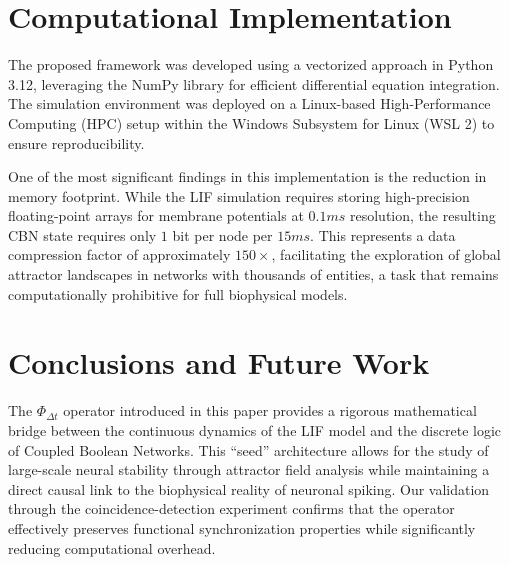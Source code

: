 \documentclass[10pt, conference]{IEEEtran}
\begin{document}

\section{Computational Implementation}

The proposed framework was developed using a vectorized approach in Python 3.12, leveraging the NumPy library for efficient differential equation integration. The simulation environment was deployed on a Linux-based High-Performance Computing (HPC) setup within the Windows Subsystem for Linux (WSL 2) to ensure reproducibility.

One of the most significant findings in this implementation is the reduction in memory footprint. While the LIF simulation requires storing high-precision floating-point arrays for membrane potentials at $0.1ms$ resolution, the resulting CBN state requires only $1$ bit per node per $15ms$. This represents a data compression factor of approximately $150\times$, facilitating the exploration of global attractor landscapes in networks with thousands of entities, a task that remains computationally prohibitive for full biophysical models.


\section{Conclusions and Future Work}

The $\Phi_{\Delta t}$ operator introduced in this paper provides a rigorous mathematical bridge between the continuous dynamics of the LIF model and the discrete logic of Coupled Boolean Networks. This ``seed'' architecture allows for the study of large-scale neural stability through attractor field analysis while maintaining a direct causal link to the biophysical reality of neuronal spiking. Our validation through the coincidence-detection experiment confirms that the operator effectively preserves functional synchronization properties while significantly reducing computational overhead.
\end{document}
